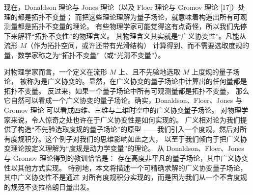 \documentclass[11pt,a4paper]{article}
\begin{document}

现在，Donaldson 理论与 Jones 理论（以及 Floer 理论与 Gromov 理论 [17]）处理的都是拓扑不变量；
而把这些理论理解为量子场论，就意味着构造出所有可观测量都是拓扑不变量的理论。
有些物理学家可能觉得这有点奇怪，所以我们先停下来解释“拓扑不变性”的物理含义。
其物理含义其实就是“广义协变性”。凡能从流形 $M$（作为拓扑空间，或许还带有光滑结构）
计算得到、而不需要选取度规的量，数学家称之为“拓扑不变量”（或“光滑不变量”）。

对物理学家而言，一个定义在流形 $M$ 上、且不先验地选取 $M$ 上度规的量子场论，
被称为是广义协变的。显然，在广义协变的量子场论中计算出的任何量都是拓扑不变量。
反过来，如果一个量子场论中所有可观测量都是拓扑不变量，
那么它自然可以看成一个广义协变的量子场论。确实，Donaldson、Floer、Jones 与 Gromov 理论
可以看成四维、三维与二维时空中的广义协变量子场论。
对物理学家来说，令人惊奇之处也许在于广义协变性是如何实现的。
广义相对论为我们提供了构造“不先验选取度规的量子场论”的原型
——我们引入一个度规，然后对所有度规积分。这个例子对我们的思维影响如此之大，
以至于我们倾向于把广义协变理论按定义理解为“度规是动力学变量”的理论。
从 Donaldson、Floer、Jones 与 Gromov 理论得到的教训恰恰是：
存在高度非平凡的量子场论，其中广义协变性以其他方式实现。
特别地，本文将描述一个可精确求解的广义协变量子场论，其中广义协变性不是通过
对所有度规积分实现的，而是因为我们从一个不含度规的规范不变拉格朗日量出发。

%
\end{document}
